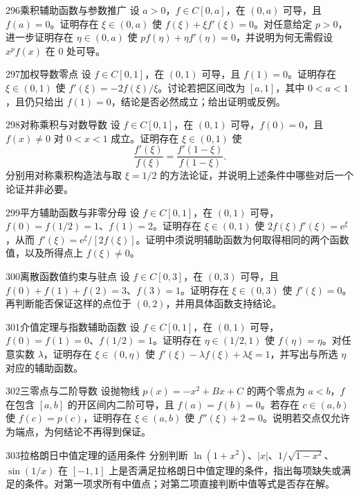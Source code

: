\begin{exercise}{296}{乘积辅助函数与参数推广}
设 $a>0$，$f\in C[0,a]$，在 $(0,a)$ 可导，且 $f(a)=0$。证明存在 $\xi\in(0,a)$ 使 $f(\xi)+\xi f'(\xi)=0$。对任意给定 $p>0$，进一步证明存在 $\eta\in(0,a)$ 使 $pf(\eta)+\eta f'(\eta)=0$，并说明为何无需假设 $x^pf(x)$ 在 $0$ 处可导。
\end{exercise}
\begin{exercise}{297}{加权导数零点}
设 $f\in C[0,1]$，在 $(0,1)$ 可导，且 $f(1)=0$。证明存在 $\xi\in(0,1)$ 使 $f'(\xi)=-2f(\xi)/\xi$。讨论若把区间改为 $[a,1]$，其中 $0<a<1$，且仍只给出 $f(1)=0$，结论是否必然成立；给出证明或反例。
\end{exercise}
\begin{exercise}{298}{对称乘积与对数导数}
设 $f\in C[0,1]$，在 $(0,1)$ 可导，$f(0)=0$，且 $f(x)\ne0$ 对 $0<x<1$ 成立。证明存在 $\xi\in(0,1)$ 使
\[\frac{f'(\xi)}{f(\xi)}=\frac{f'(1-\xi)}{f(1-\xi)}.\]
分别用对称乘积构造法与取 $\xi=1/2$ 的方法论证，并说明上述条件中哪些对后一个论证并非必要。
\end{exercise}
\begin{exercise}{299}{平方辅助函数与非零分母}
设 $f\in C[0,1]$，在 $(0,1)$ 可导，$f(0)=f(1/2)=1$、$f(1)=2$。证明存在 $\xi\in(0,1)$ 使 $2f(\xi)f'(\xi)=\mathrm e^{\xi}$，从而 $f'(\xi)=\mathrm e^{\xi}/[2f(\xi)]$。证明中须说明辅助函数为何取得相同的两个函数值，以及所得点上 $f(\xi)\ne0$。
\end{exercise}
\begin{exercise}{300}{离散函数值约束与驻点}
设 $f\in C[0,3]$，在 $(0,3)$ 可导，且 $f(0)+f(1)+f(2)=3$、$f(3)=1$。证明存在 $\xi\in(0,3)$ 使 $f'(\xi)=0$。再判断能否保证这样的点位于 $(0,2)$，并用具体函数支持结论。
\end{exercise}
\begin{exercise}{301}{介值定理与指数辅助函数}
设 $f\in C[0,1]$，在 $(0,1)$ 可导，$f(0)=f(1)=0$、$f(1/2)=1$。证明存在 $\eta\in(1/2,1)$ 使 $f(\eta)=\eta$。对任意实数 $\lambda$，证明存在 $\xi\in(0,\eta)$ 使 $f'(\xi)-\lambda f(\xi)+\lambda\xi=1$，并写出与所选 $\eta$ 对应的辅助函数。
\end{exercise}
\begin{exercise}{302}{三零点与二阶导数}
设抛物线 $p(x)=-x^2+Bx+C$ 的两个零点为 $a<b$，$f$ 在包含 $[a,b]$ 的开区间内二阶可导，且 $f(a)=f(b)=0$。若存在 $c\in(a,b)$ 使 $f(c)=p(c)$，证明存在 $\xi\in(a,b)$ 使 $f''(\xi)+2=0$。说明若交点仅允许为端点，为何结论不再得到保证。
\end{exercise}
\begin{exercise}{303}{拉格朗日中值定理的适用条件}
分别判断 $\ln(1+x^2)$、$|x|$、$1/\sqrt{1-x^2}$、$\sin(1/x)$ 在 $[-1,1]$ 上是否满足拉格朗日中值定理的条件，指出每项缺失或满足的条件。对第一项求所有中值点；对第二项直接判断中值等式是否存在解。
\end{exercise}
